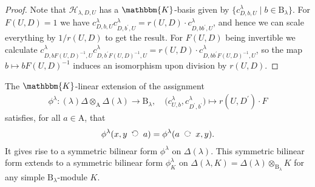 \documentclass[a4paper,11pt]{amsart}
\newcommand{\actsleft}{\mathop{\,\;\raisebox{1.7ex}{\rotatebox{-90}{$\circlearrowright$}}\;\,}}
\newcommand{\actsright}{\mathop{\,\;\raisebox{0ex}{\rotatebox{90}{$\circlearrowleft$}}\;\,}}
\newcommand{\setstuff}[1]{\mathrm{#1}}
\newcommand{\hcirc}{\otimes}
\newcommand{\KK}{\mathbbm{K}}
\numberwithin{equation}{section}
\begin{document}
\begin{proof}
Note that $\mathcal{H}_{\lambda,D,U}$ 
has a $\KK$-basis given by 
$\{c_{D,b,U}^{\lambda}\mid b\in\setstuff{B}_{\lambda}\}$. 
For $F(U,D)=1$ we have
$c_{D,b,U}^{\lambda}c_{D,b^{\prime},U}^{\lambda}
=r(U,D)\cdot c_{D,bb^{\prime},U}^{\lambda}$, and hence 
we can scale everything by $1/r(U,D)$ to get the result.
For $F(U,D)$ being invertible we calculate 
$c_{D,bF(U,D)^{-1},U}^{\lambda}c_{D,b^{\prime}F(U,D)^{-1},U}^{\lambda}
=r(U,D)\cdot c_{D,bb^{\prime}F(U,D)^{-1},U}^{\lambda}$, 
so the map $b\mapsto bF(U,D)^{-1}$ induces an isomorphism 
upon division by $r(U,D)$.
\end{proof}

\begin{lemma}\label{lemma:bilinearform}
The $\KK$-linear extension 
of the assignment
\begin{gather*}
\phi^{\lambda}\colon
(\lambda)\Delta\hcirc_{\setstuff{A}}
\Delta(\lambda)\to\setstuff{B}_{\lambda}
,\quad
\big(c_{U,b}^{\lambda},c_{D^{\prime},b^{\prime}}^{\lambda}
\big)\mapsto
r(U,D^{\prime})\cdot F
\end{gather*}
satisfies, for all $a\in\setstuff{A}$, that
\begin{gather*}
\phi^{\lambda}
(x,y\actsright a)=
\phi^{\lambda}
(a\actsleft x,y).
\end{gather*}
It gives rise to a symmetric bilinear form $\phi^{\lambda}$ on $\Delta(\lambda)$. 
This symmetric bilinear form extends to 
a symmetric bilinear form $\phi^{\lambda}_{K}$
on $\Delta(\lambda,K)=\Delta(\lambda)\hcirc_{\setstuff{B}_{\lambda}}K$ 
for any simple $\setstuff{B}_{\lambda}$-module $K$.
\end{lemma}
\end{document}
